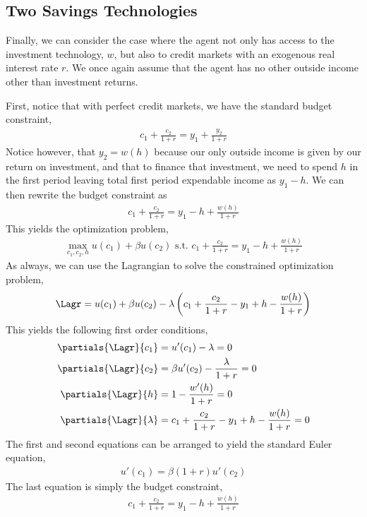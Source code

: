 \subsection*{Two Savings Technologies}
Finally, we can consider the case where the agent not only has access to the investment technology, $w$, but also to credit markets with an exogenous real interest rate $r$. We once again assume that the agent has no other outside income other than investment returns. 

First, notice that with perfect credit markets, we have the standard budget constraint,
\begin{align*}
    c_1 + \frac{c_2}{1 + r} = y_1 + \frac{y_2}{1 + r}
\end{align*}
Notice however, that $y_2 = w(h)$ because our only outside income is given by our return on investment, and that to finance that investment, we need to spend $h$ in the first period leaving total first period expendable income as $y_1 - h$. We can then rewrite the budget constraint as
\begin{align*}
    c_1 + \frac{c_2}{1 + r} = y_1 - h + \frac{w(h)}{1 + r}
\end{align*}
This yields the optimization problem,
\begin{align*}
    \max_{c_1, c_2, h} u(c_1) + \beta u(c_2) \text{ s.t. } c_1 + \frac{c_2}{1 + r} = y_1 - h + \frac{w(h)}{1 + r}
\end{align*}
As always, we can use the Lagrangian to solve the constrained optimization problem,
\begin{align*}
    \Lagr = u(c_1) + \beta u(c_2) - \lambda \left(c_1 + \frac{c_2}{1+r} - y_1 + h - \frac{w(h)}{1 + r}\right)
\end{align*}
This yields the following first order conditions,
\begin{align*}
\partials{\Lagr}{c_1} &= u'(c_1) - \lambda = 0 \\
\partials{\Lagr}{c_2} &= \beta u'(c_2) - \frac{\lambda}{1 + r} = 0 \\
\partials{\Lagr}{h} &= 1 - \frac{w'(h)}{1 + r} = 0 \\
\partials{\Lagr}{\lambda} &= c_1 + \frac{c_2}{1+r} - y_1 + h - \frac{w(h)}{1 + r} = 0
\end{align*}
The first and second equations can be arranged to yield the standard Euler equation,
\begin{align*}
    u'(c_1) = \beta (1 + r) u'(c_2)
\end{align*}
The last equation is simply the budget constraint,
\begin{align*}
    c_1 + \frac{c_2}{1+r} = y_1 - h + \frac{w(h)}{1 + r}
\end{align*}

